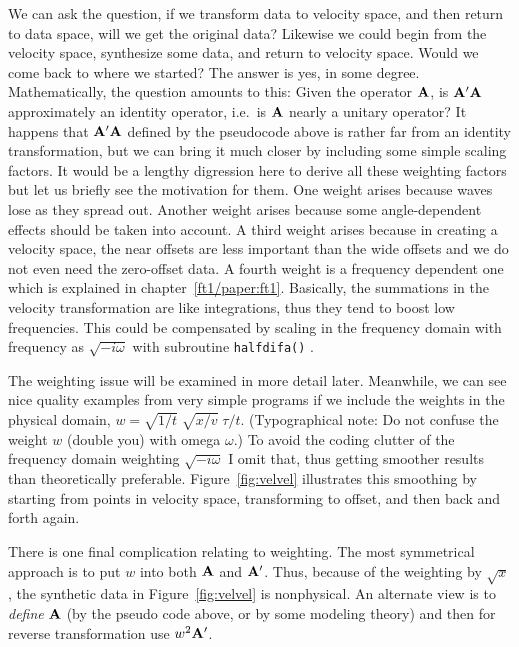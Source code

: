 \par
We can ask the question, if we transform data to velocity space,
and then return to data space,
will we get the original data?
Likewise we could begin from the velocity space,
synthesize some data, and return to velocity space.
Would we come back to where we started?
The answer is yes, in some degree.
Mathematically, the question amounts to this:
Given the operator $\bold A$, is $\bold A'\bold A$ approximately
an identity operator, i.e.~is $\bold A$ nearly a unitary operator?
It happens that $\bold A'\bold A$ defined by the pseudocode above
is rather far from an identity transformation,
but we can bring it much closer
by including some simple scaling factors.
It would be a lengthy digression here to derive all these weighting factors
but let us briefly see the motivation for them.
One weight arises because waves lose  as they spread out.
Another weight arises because some angle-dependent effects should be taken
into account.  A third weight arises because in creating a velocity space,
the near offsets are less important than the wide offsets
and we do not even need the zero-offset data.
A fourth weight is a frequency dependent one
which is explained in chapter~\ref{ft1/paper:ft1}.
Basically, the summations in the velocity transformation are like integrations,
thus they tend to boost low frequencies.
This could be compensated by scaling
in the frequency domain
with frequency as $\sqrt{-i\omega}$
with subroutine \texttt{halfdifa()} .

\par
The weighting issue will be examined in more detail later.
Meanwhile, we can see nice quality examples
from very simple programs
if we include the weights
in the physical domain, $w= \sqrt{1/t}\; \sqrt{x/v}\; \tau /t $.
(Typographical note:  Do not confuse
the weight $w$ (double you) with omega $\omega$.)
To avoid the coding clutter of the frequency domain weighting
$\sqrt{-i\omega}$ I omit that,
thus getting smoother results than theoretically preferable.
Figure~\ref{fig:velvel} illustrates this smoothing by starting
from points in velocity space, transforming to offset,
and then back and forth again.


\par
There is one final complication relating to weighting.
The most symmetrical approach is to put
$w$ into both $\bold A$ and $\bold A'$.
Thus, because of the weighting by $\sqrt{x}$,
the synthetic data in Figure~\ref{fig:velvel} is
nonphysical.
An alternate view is to {\em  define} $\bold A$
(by the pseudo code above, or by some modeling theory)
and then for reverse transformation
use $w^2\bold A'$.

